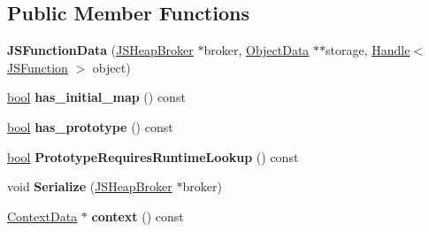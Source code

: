 \subsection*{Public Member Functions}
\begin{DoxyCompactItemize}
\item 
\mbox{\label{classv8_1_1internal_1_1compiler_1_1JSFunctionData_ae755833cd81ed9513d6c2a57629796ca}} 
{\bfseries J\+S\+Function\+Data} (\mbox{\hyperlink{classv8_1_1internal_1_1compiler_1_1JSHeapBroker}{J\+S\+Heap\+Broker}} $\ast$broker, \mbox{\hyperlink{classv8_1_1internal_1_1compiler_1_1ObjectData}{Object\+Data}} $\ast$$\ast$storage, \mbox{\hyperlink{classv8_1_1internal_1_1Handle}{Handle}}$<$ \mbox{\hyperlink{classv8_1_1internal_1_1JSFunction}{J\+S\+Function}} $>$ object)
\item 
\mbox{\label{classv8_1_1internal_1_1compiler_1_1JSFunctionData_ac55f43fdec1a0c8ecd57cbdd2d4729a7}} 
\mbox{\hyperlink{classbool}{bool}} {\bfseries has\+\_\+initial\+\_\+map} () const
\item 
\mbox{\label{classv8_1_1internal_1_1compiler_1_1JSFunctionData_a4af3b0d8e4d0b0550ab4a8670a6eaa7e}} 
\mbox{\hyperlink{classbool}{bool}} {\bfseries has\+\_\+prototype} () const
\item 
\mbox{\label{classv8_1_1internal_1_1compiler_1_1JSFunctionData_ab6f67053a285938be4f17eaa5bf62430}} 
\mbox{\hyperlink{classbool}{bool}} {\bfseries Prototype\+Requires\+Runtime\+Lookup} () const
\item 
\mbox{\label{classv8_1_1internal_1_1compiler_1_1JSFunctionData_a820afc8d0756336ea21899d4f75abbd9}} 
void {\bfseries Serialize} (\mbox{\hyperlink{classv8_1_1internal_1_1compiler_1_1JSHeapBroker}{J\+S\+Heap\+Broker}} $\ast$broker)
\item 
\mbox{\label{classv8_1_1internal_1_1compiler_1_1JSFunctionData_ae6efb770d120b2efe0b11dbf7e4c3f81}} 
\mbox{\hyperlink{classv8_1_1internal_1_1compiler_1_1ContextData}{Context\+Data}} $\ast$ {\bfseries context} () const
$$
\end{DoxyCompactItemize}
